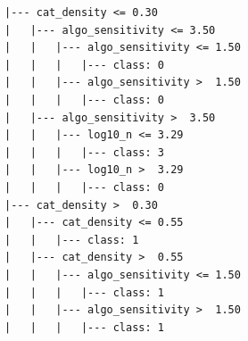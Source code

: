 \begin{verbatim}
|--- cat_density <= 0.30
|   |--- algo_sensitivity <= 3.50
|   |   |--- algo_sensitivity <= 1.50
|   |   |   |--- class: 0
|   |   |--- algo_sensitivity >  1.50
|   |   |   |--- class: 0
|   |--- algo_sensitivity >  3.50
|   |   |--- log10_n <= 3.29
|   |   |   |--- class: 3
|   |   |--- log10_n >  3.29
|   |   |   |--- class: 0
|--- cat_density >  0.30
|   |--- cat_density <= 0.55
|   |   |--- class: 1
|   |--- cat_density >  0.55
|   |   |--- algo_sensitivity <= 1.50
|   |   |   |--- class: 1
|   |   |--- algo_sensitivity >  1.50
|   |   |   |--- class: 1
\end{verbatim}
